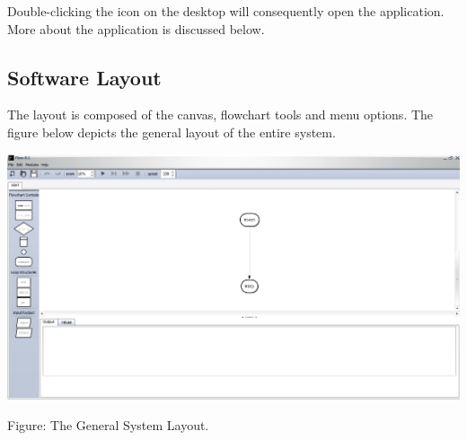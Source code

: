 \documentclass[11pt,a4paper,titlepage]{article}
\begin{document}
		
		Double-clicking the icon on the desktop will consequently open the application. More about the application is discussed below.
		
		
		\subsection{Software Layout}
		The layout is composed of the canvas, flowchart tools and menu options. The figure below depicts the general layout of the entire system.
		
		\includegraphics[width=\textwidth]{images/SystemLayout.jpg}
		\begin{center}
		Figure: The General System Layout.\newline
		\end{center}
		
\end{document}
